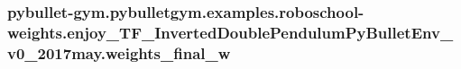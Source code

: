 \subsubsection[{\texorpdfstring{weights\+\_\+final\+\_\+w}{weights_final_w}}]{\setlength{\rightskip}{0pt plus 5cm}pybullet-\/gym.\+pybulletgym.\+examples.\+roboschool-\/weights.\+enjoy\+\_\+\+T\+F\+\_\+\+Inverted\+Double\+Pendulum\+Py\+Bullet\+Env\+\_\+v0\+\_\+2017may.\+weights\+\_\+final\+\_\+w}\hypertarget{namespacepybullet-gym_1_1pybulletgym_1_1examples_1_1roboschool-weights_1_1enjoy___t_f___inverted4815cf8a7bea8454ae92c5ac92dac9b4_a2dbcafd8960fdd22407081b9a6e0070a}{}\label{namespacepybullet-gym_1_1pybulletgym_1_1examples_1_1roboschool-weights_1_1enjoy___t_f___inverted4815cf8a7bea8454ae92c5ac92dac9b4_a2dbcafd8960fdd22407081b9a6e0070a}
